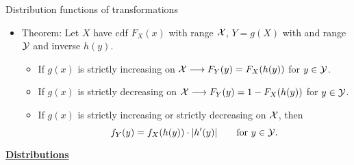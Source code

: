 \documentclass{article}
\newcommand{\bu}[1]{\textbf{\ul{#1}}}				%
\begin{document}
Distribution functions of transformations
\begin{itemize}
    \item Theorem: Let $X$ have cdf $F_X(x)$ with range ${\cal X}$, $Y = g(X)$ with and range ${\cal Y}$ and inverse $h(y)$.\bigskip
    \begin{itemize}
        \item If $g(x)$ is strictly increasing on ${\cal X} \longrightarrow F_Y(y) = F_X(h(y))$ for $y \in {\cal Y}$.
        \item If $g(x)$ is strictly decreasing on ${\cal X} \longrightarrow F_Y(y) = 1 - F_X(h(y))$ for $y \in {\cal Y}$.\bigskip
        \item If $g(x)$ is strictly increasing or strictly decreasing on ${\cal X}$, then
         \[f_Y(y) = f_X(h(y)) \cdot \lvert h'(y) \rvert \quad\quad \text{for } y \in {\cal Y}.\]
    \end{itemize}
\end{itemize}


\newpage

{\large \bu{Distributions}}\bigskip
\end{document}
